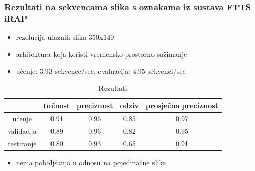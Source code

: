 \documentclass{beamer}
\begin{document}
\begin{frame}
 \frametitle{Rezultati na sekvencama slika s oznakama iz sustava FTTS iRAP}
 \begin{itemize}
  \item rezolucija ulaznih slika $350$x$140$
  \item arhitektura koja koristi vremensko-prostorno sažimanje
    \item učenje: 3.93 sekvence/sec, evaluacija: 4.95 sekvenci/sec
 \end{itemize}
 
\begin{table}[H]
\centering
\caption{Rezultati}
\label{score:pooling}
\begin{tabular}{c|c|c|c|c|}
\cline{2-5}
                                            & točnost & preciznost & odziv & prosječna preciznost \\ \hline
\multicolumn{1}{|c|}{učenje}     & 0.91       & 0.96        & 0.85     &           0.97           \\ \hline
\multicolumn{1}{|c|}{validacija} & 0.89       & 0.96        & 0.82     &            0.95          \\ \hline
\multicolumn{1}{|c|}{testiranje} & 0.80       & 0.93        & 0.65     &            0.91          \\ \hline
\end{tabular}
\end{table}

\begin{itemize}
 \item nema poboljšanja u odnosu na pojedinačne slike
\end{itemize}

\end{frame}
\end{document}
